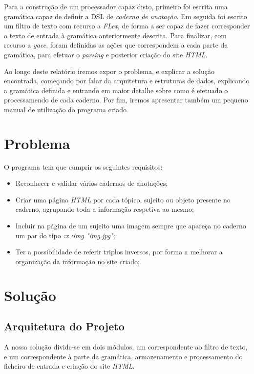 \documentclass[a4paper]{report}
\begin{document}
Para a construção de um processador capaz disto, primeiro foi escrita uma
gramática capaz de definir a DSL de \textit{caderno de anotação}. Em seguida foi
escrito um filtro de texto com recurso a \textit{FLex}, de forma a ser capaz de
fazer corresponder o texto de entrada à gramática anteriormente descrita. Para
finalizar, com recurso a \textit{yacc}, foram definidas as ações que
correspondem a cada parte da gramática, para efetuar o \textit{parsing} e
posterior criação do site \textit{HTML}.

Ao longo deste relatório iremos expor o problema, e explicar a solução
encontrada, começando por falar da arquitetura e estruturas de dados, explicando
a gramática definida e entrando em maior detalhe sobre como é efetuado o
processamendo de cada caderno. Por fim, iremos apresentar também um pequeno
manual de utilização do programa criado.

\chapter{Problema}

O programa tem que cumprir os seguintes requisitos:
\begin{itemize}
    \item Reconhecer e validar vários cadernos de anotações;
    \item Criar uma página \textit{HTML} por cada tópico, sujeito ou objeto
        presente no caderno, agrupando toda a informação respetiva ao mesmo;
    \item Incluir na página de um sujeito uma imagem sempre que apareça no
        caderno um par do tipo \textit{:x :img "img.jpg"};
    \item Ter a possibilidade de referir triplos inversos, por forma a melhorar
        a organização da informação no site criado;
\end{itemize}

\chapter{Solução}

\section{Arquitetura do Projeto}

A nossa solução divide-se em dois módulos, um correspondente ao filtro de texto,
e um correspondente à parte da gramática, armazenamento e processamento do
ficheiro de entrada e criação do site \textit{HTML}.
\end{document}
